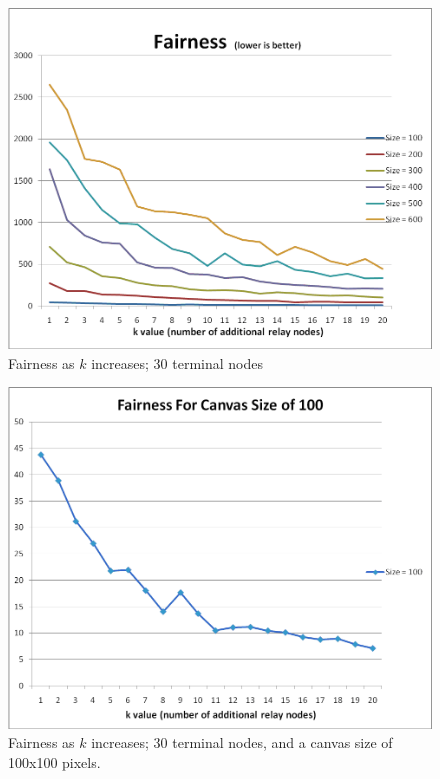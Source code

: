 \begin{figure}[htp]
\centering
\includegraphics[scale=0.385]{images/4.PNG}
\caption{Fairness as $k$ increases; 30 terminal nodes}
\label{4}
\end{figure}

\begin{figure}[htp]
\centering
\includegraphics[scale=0.375]{images/5.PNG}
\caption{Fairness as $k$ increases; 30 terminal nodes, and a canvas size of 100x100 pixels.}
\label{5}
\end{figure}

